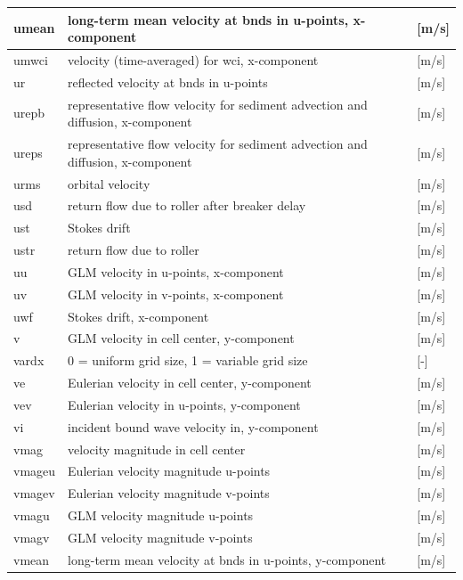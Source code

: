 \documentclass{article}
\begin{document}
\begin{tabular}{|p{0.7in}|p{2.5in}|p{0.9in}|}
umean & long-term mean velocity at bnds in u-points, x-component         & [m/s] \\ \hline 
umwci & velocity (time-averaged) for wci, x-component            & [m/s] \\ \hline 
ur & reflected velocity at bnds in u-points           & [m/s] \\ \hline 
urepb & representative flow velocity for sediment advection and diffusion, x-component        & [m/s] \\ \hline 
ureps & representative flow velocity for sediment advection and diffusion, x-component        & [m/s] \\ \hline 
urms & orbital velocity               & [m/s] \\ \hline 
usd & return flow due to roller after breaker delay         & [m/s] \\ \hline 
ust & Stokes drift               & [m/s] \\ \hline 
ustr & return flow due to roller            & [m/s] \\ \hline 
uu & GLM velocity in u-points, x-component            & [m/s] \\ \hline 
uv & GLM velocity in v-points, x-component            & [m/s] \\ \hline 
uwf & Stokes drift, x-component              & [m/s] \\ \hline 
v & GLM velocity in cell center, y-component           & [m/s] \\ \hline 
vardx & 0 = uniform grid size, 1 = variable grid size       & [-] \\ \hline 
ve & Eulerian velocity in cell center, y-component           & [m/s] \\ \hline 
vev & Eulerian velocity in u-points, y-component            & [m/s] \\ \hline 
vi & incident bound wave velocity in, y-component           & [m/s] \\ \hline 
vmag & velocity magnitude in cell center            & [m/s] \\ \hline 
vmageu & Eulerian velocity magnitude u-points             & [m/s] \\ \hline 
vmagev & Eulerian velocity magnitude v-points             & [m/s] \\ \hline 
vmagu & GLM velocity magnitude u-points             & [m/s] \\ \hline 
vmagv & GLM velocity magnitude v-points             & [m/s] \\ \hline 
vmean & long-term mean velocity at bnds in u-points, y-component         & [m/s] \\ \hline 

\end{tabular}
\end{document}

